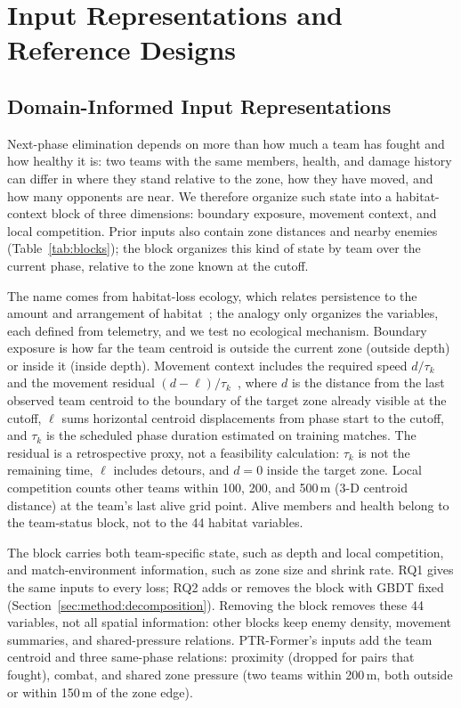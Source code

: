 \documentclass[sigconf,anonymous]{acmart}
\begin{document}
\section{Input Representations and Reference Designs}
\label{sec:method:design}
\subsection{Domain-Informed Input Representations}
\label{sec:method:representation}
Next-phase elimination depends on more than how much a team has fought and how healthy it is: two teams with the same members, health, and damage history can differ in where they stand relative to the zone, how they have moved, and how many opponents are near. We therefore organize such state into a habitat-context block of three dimensions: boundary exposure, movement context, and local competition. Prior inputs also contain zone distances and nearby enemies (Table~\ref{tab:blocks}); the block organizes this kind of state by team over the current phase, relative to the zone known at the cutoff.

The name comes from habitat-loss ecology, which relates persistence to the amount and arrangement of habitat~\cite{Fahrig03}; the analogy only organizes the variables, each defined from telemetry, and we test no ecological mechanism. Boundary exposure is how far the team centroid is outside the current zone (outside depth) or inside it (inside depth). Movement context includes the required speed $d/\tau_k$ and the movement residual $(d-\ell)/\tau_k$~\cite{Nathan08}, where $d$ is the distance from the last observed team centroid to the boundary of the target zone already visible at the cutoff, $\ell$ sums horizontal centroid displacements from phase start to the cutoff, and $\tau_k$ is the scheduled phase duration estimated on training matches. The residual is a retrospective proxy, not a feasibility calculation: $\tau_k$ is not the remaining time, $\ell$ includes detours, and $d=0$ inside the target zone. Local competition counts other teams within 100, 200, and 500\,m (3-D centroid distance) at the team's last alive grid point. Alive members and health belong to the team-status block, not to the 44 habitat variables.

The block carries both team-specific state, such as depth and local competition, and match-environment information, such as zone size and shrink rate. RQ1 gives the same inputs to every loss; RQ2 adds or removes the block with GBDT fixed (Section~\ref{sec:method:decomposition}). Removing the block removes these 44 variables, not all spatial information: other blocks keep enemy density, movement summaries, and shared-pressure relations. PTR-Former's inputs add the team centroid and three same-phase relations: proximity (dropped for pairs that fought), combat, and shared zone pressure (two teams within 200\,m, both outside or within 150\,m of the zone edge).
\end{document}
